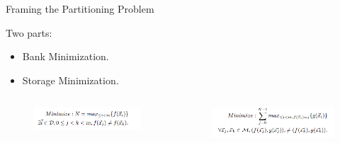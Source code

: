 \documentclass[xcolor=dvipsnames]{beamer}
\begin{document}
    \begin{frame}{Framing the Partitioning Problem}

        Two parts:
        \begin{itemize}
            \item Bank Minimization.
            \item Storage Minimization.
        \end{itemize} 

        \begin{columns}
            
            \begin{column}{0.5\textwidth}

                \begin{figure}
                    \includegraphics[scale=0.8]{BankPart.PNG}
                \end{figure}
                
            \end{column}

            \begin{column}{0.5\textwidth}

                \begin{figure}
                    \includegraphics[scale=0.8]{StorePart.PNG}
                \end{figure}
                
            \end{column}

        \end{columns}
        
    \end{frame}
\end{document}
